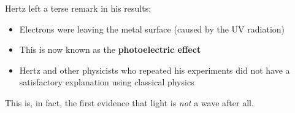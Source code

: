 
Hertz left a terse remark in his results:
\begin{center}
  \end{center}
\begin{itemize}
\item Electrons were leaving the metal surface (caused by the UV radiation)
\item This is now known as the \textbf{photoelectric effect}
\item Hertz and other physicists who repeated his experiments did not have a
  satisfactory explanation using classical physics
\end{itemize}
This is, in fact, the first evidence that light is \emph{not} a wave after all.





